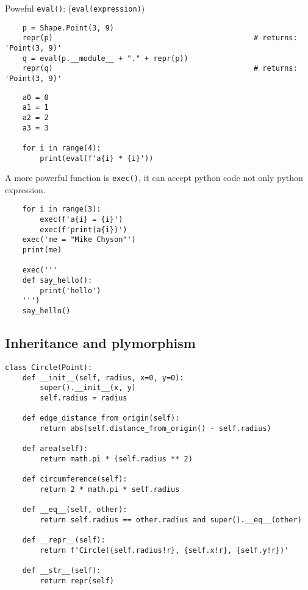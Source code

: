 \begin{tcolorbox}
  Poweful \verb|eval()|: (\verb|eval(expression)|)
  \begin{lstlisting}
    p = Shape.Point(3, 9)
    repr(p)                                              # returns: 'Point(3, 9)'
    q = eval(p.__module__ + "." + repr(p))        
    repr(q)                                              # returns: 'Point(3, 9)'
  \end{lstlisting}


  \begin{lstlisting}
    a0 = 0
    a1 = 1
    a2 = 2
    a3 = 3
    
    for i in range(4):
        print(eval(f'a{i} * {i}'))
  \end{lstlisting}

  A more powerful function is \verb|exec()|,
  it can accept python code not only python expression.
  \begin{lstlisting}
    for i in range(3):
        exec(f'a{i} = {i}')
        exec(f'print(a{i})')
    exec('me = "Mike Chyson"')
    print(me)

    exec('''
    def say_hello():
        print('hello')
    ''')
    say_hello()
  \end{lstlisting}

\end{tcolorbox}



\subsection{Inheritance and plymorphism}

\begin{lstlisting}
class Circle(Point):
    def __init__(self, radius, x=0, y=0):
        super().__init__(x, y)
        self.radius = radius

    def edge_distance_from_origin(self):
        return abs(self.distance_from_origin() - self.radius)

    def area(self):
        return math.pi * (self.radius ** 2)

    def circumference(self):
        return 2 * math.pi * self.radius

    def __eq__(self, other):
        return self.radius == other.radius and super().__eq__(other)

    def __repr__(self):
        return f'Circle({self.radius!r}, {self.x!r}, {self.y!r})'

    def __str__(self):
        return repr(self)
\end{lstlisting}



